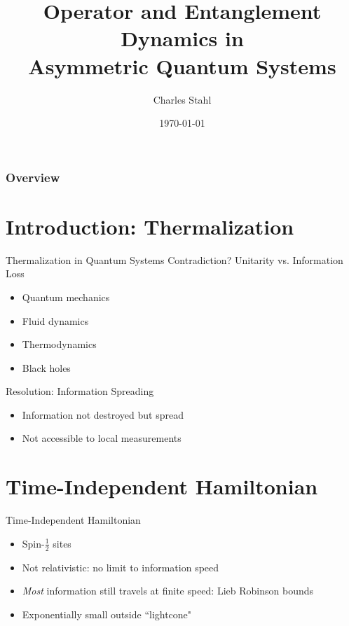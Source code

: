 \documentclass{beamer}
\title[Asymmetric Dynamics]{Operator and Entanglement Dynamics in \\Asymmetric Quantum Systems} %
\author{Charles Stahl} %
\date{\today} %
\newcommand{\half}{\frac{1}{2}}
\begin{document}
\begin{frame}
\titlepage %
\end{frame}

\begin{frame}
\frametitle{Overview} %
\tableofcontents %
\end{frame}


\section{Introduction: Thermalization}

\begin{frame}{Thermalization in Quantum Systems}
Contradiction? Unitarity vs. Information Loss
\begin{itemize}
	\item Quantum mechanics
	\item Fluid dynamics
	\item Thermodynamics
	\item Black holes
\end{itemize}
Resolution: Information Spreading
\begin{itemize}
	\item Information not destroyed but spread
	\item Not accessible to local measurements
\end{itemize}
\end{frame}

\section{Time-Independent Hamiltonian}

\begin{frame}{Time-Independent Hamiltonian}
\begin{itemize}
	\item Spin-$\half$ sites
	\item Not relativistic: no limit to information speed
	\item \emph{Most} information still travels at finite speed: Lieb Robinson bounds
	\item Exponentially small outside ``lightcone"
\end{itemize}
\end{frame}
\end{document}
